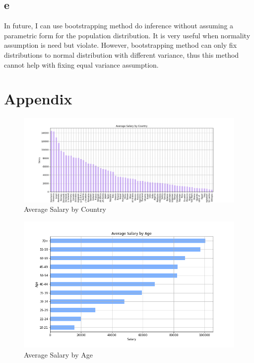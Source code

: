 \documentclass[10pt,onecolumn,letterpaper]{article}
\begin{document}
\subsection*{e}
In future, I can use bootstrapping method do inference without assuming a parametric form for the population distribution. It is very useful when normality assumption is need but violate. However, bootstrapping method can only fix distributions to normal distribution with different variance, thus this method cannot help with fixing equal variance assumption.

\section*{Appendix}

\appendix
\begin{figure}[htbp]
  \centering
  \includegraphics[width=1\textwidth]{f1.png}
  \caption{Average Salary by Country}
\end{figure}

\begin{figure}[htbp]
  \centering
  \includegraphics[width=1\textwidth]{f2.png}
  \caption{Average Salary by Age}
\end{figure}
\end{document}

